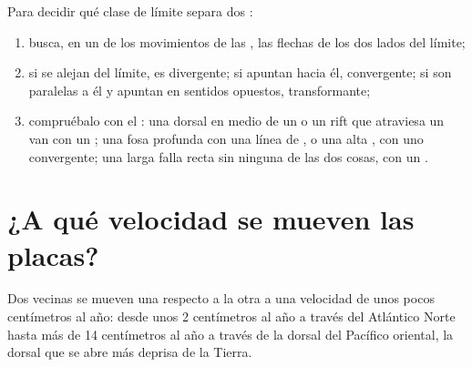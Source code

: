 \begin{method}\label{met:g7:plate-tectonics:recognise}
Para decidir qué clase de límite separa dos :
\begin{enumerate}
  \item busca, en un  de los movimientos de las , las flechas de
        los dos lados del límite;
  \item si se alejan del límite, es divergente; si apuntan hacia él,
        convergente; si son paralelas a él y apuntan en sentidos opuestos,
        transformante;
  \item compruébalo con el : una dorsal en medio de un  o un
        rift que atraviesa un  van con un ; una
        fosa profunda con una línea de , o una alta , con
        uno convergente; una larga falla recta sin ninguna de las dos cosas,
        con un .
\end{enumerate}
\end{method}

\section{¿A qué velocidad se mueven las placas?}

\begin{proposition}\label{prop:g7:plate-tectonics:speed}
Dos  vecinas se mueven una respecto a la otra a una velocidad de unos
pocos centímetros al año: desde unos 2 centímetros al año a través del
Atlántico Norte hasta más de 14 centímetros al año a través de la dorsal
del Pacífico oriental, la dorsal que se abre más deprisa de la Tierra.
\end{proposition}

